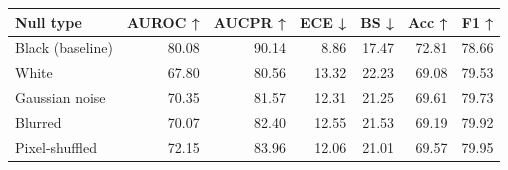 \begin{tabular}{lrrrrrr}
\toprule
Null type & AUROC ↑ & AUCPR ↑ & ECE ↓ & BS ↓ & Acc ↑ & F1 ↑ \\
\midrule
Black (baseline) & 80.08 & 90.14 & 8.86 & 17.47 & 72.81 & 78.66 \\
White & 67.80 & 80.56 & 13.32 & 22.23 & 69.08 & 79.53 \\
Gaussian noise & 70.35 & 81.57 & 12.31 & 21.25 & 69.61 & 79.73 \\
Blurred & 70.07 & 82.40 & 12.55 & 21.53 & 69.19 & 79.92 \\
Pixel-shuffled & 72.15 & 83.96 & 12.06 & 21.01 & 69.57 & 79.95 \\
\bottomrule
\end{tabular}
